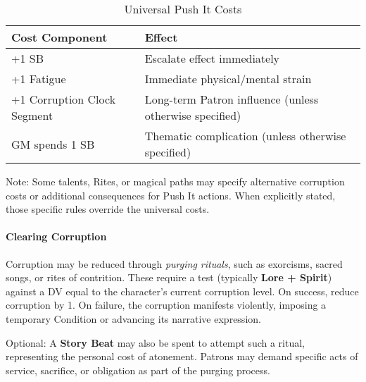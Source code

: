 \begin{table}[h]
\centering
\caption{Universal Push It Costs}
\begin{tabular}{|l|l|}
\hline
\textbf{Cost Component} & \textbf{Effect} \\ 
\hline
+1 SB & Escalate effect immediately \\ 
+1 Fatigue & Immediate physical/mental strain \\ 
+1 Corruption Clock Segment & Long-term Patron influence (unless otherwise specified) \\ 
GM spends 1 SB & Thematic complication (unless otherwise specified) \\ 
\hline
\end{tabular}
\end{table}

Note: Some talents, Rites, or magical paths may specify alternative corruption costs or additional consequences for Push It actions. When explicitly stated, those specific rules override the universal costs.

\paragraph{Clearing Corruption}
Corruption may be reduced through \textit{purging rituals}, such as exorcisms, sacred songs, or rites of contrition. 
These require a test (typically \textbf{Lore + Spirit}) against a DV equal to the character’s current corruption level.  
On success, reduce corruption by 1. On failure, the corruption manifests violently, imposing a temporary Condition or advancing its narrative expression.  

Optional: A \textbf{Story Beat} may also be spent to attempt such a ritual, representing the personal cost of atonement. Patrons may demand specific acts of service, sacrifice, or obligation as part of the purging process.

